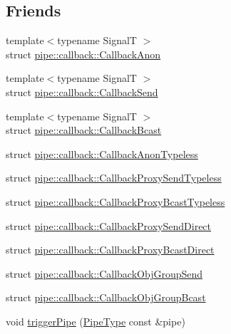\subsection*{Friends}
\begin{DoxyCompactItemize}
\item 
{\footnotesize template$<$typename SignalT $>$ }\\struct \hyperlink{structvt_1_1pipe_1_1_pipe_manager_base_a2348f4244b5ad72c5686492b15336b8b}{pipe\+::callback\+::\+Callback\+Anon}
\item 
{\footnotesize template$<$typename SignalT $>$ }\\struct \hyperlink{structvt_1_1pipe_1_1_pipe_manager_base_a2b276fd292a6811275e653a7428a694e}{pipe\+::callback\+::\+Callback\+Send}
\item 
{\footnotesize template$<$typename SignalT $>$ }\\struct \hyperlink{structvt_1_1pipe_1_1_pipe_manager_base_ada0bede5371d885f16b00f26b24d806a}{pipe\+::callback\+::\+Callback\+Bcast}
\item 
struct \hyperlink{structvt_1_1pipe_1_1_pipe_manager_base_af8e96215722e3f76890719c4b555b188}{pipe\+::callback\+::\+Callback\+Anon\+Typeless}
\item 
struct \hyperlink{structvt_1_1pipe_1_1_pipe_manager_base_a94d1bab8c5864e9c5f95bcc7e27b64de}{pipe\+::callback\+::\+Callback\+Proxy\+Send\+Typeless}
\item 
struct \hyperlink{structvt_1_1pipe_1_1_pipe_manager_base_ad1f9ea1acee2fd15aa12a680a62637c9}{pipe\+::callback\+::\+Callback\+Proxy\+Bcast\+Typeless}
\item 
struct \hyperlink{structvt_1_1pipe_1_1_pipe_manager_base_acdd1b50009e7155f2bdc2c0d8d7478f8}{pipe\+::callback\+::\+Callback\+Proxy\+Send\+Direct}
\item 
struct \hyperlink{structvt_1_1pipe_1_1_pipe_manager_base_a46319f53e42a02f8de1157c76b2c4b74}{pipe\+::callback\+::\+Callback\+Proxy\+Bcast\+Direct}
\item 
struct \hyperlink{structvt_1_1pipe_1_1_pipe_manager_base_af9d7def6910d340d015f26d19426da51}{pipe\+::callback\+::\+Callback\+Obj\+Group\+Send}
\item 
struct \hyperlink{structvt_1_1pipe_1_1_pipe_manager_base_affcd179fae984dc9ffc6c97f790ae883}{pipe\+::callback\+::\+Callback\+Obj\+Group\+Bcast}
\item 
void \hyperlink{structvt_1_1pipe_1_1_pipe_manager_base_a43a19aaa47959ca575b8c99a31433f0e}{trigger\+Pipe} (\hyperlink{namespacevt_ac9852acda74d1896f48f406cd72c7bd3}{Pipe\+Type} const \&pipe)

\end{DoxyCompactItemize}
